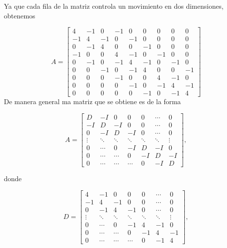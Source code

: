     Ya que cada fila de la matriz controla un movimiento en dos dimensiones, obtenemos 

    $$
    A=\left[\begin{array}{ccc|ccc|ccc}
    4 & -1 & 0 & -1 & 0 & 0 & 0 & 0 & 0 \\
    -1 & 4 & -1 & 0 & -1 & 0 & 0 & 0 & 0 \\
    0 & -1 & 4 & 0 & 0 & -1 & 0 & 0 & 0 \\
    \hline-1 & 0 & 0 & 4 & -1 & 0 & -1 & 0 & 0 \\
    0 & -1 & 0 & -1 & 4 & -1 & 0 & -1 & 0 \\
    0 & 0 & -1 & 0 & -1 & 4 & 0 & 0 & -1 \\
    \hline 0 & 0 & 0 & -1 & 0 & 0 & 4 & -1 & 0 \\
    0 & 0 & 0 & 0 & -1 & 0 & -1 & 4 & -1 \\
    0 & 0 & 0 & 0 & 0 & -1 & 0 & -1 & 4
    \end{array}\right]
    $$
De manera general ma matriz que se obtiene es de la forma

$$
A=\left[\begin{array}{ccccccc}
D & -I & 0 & 0 & 0 & \cdots & 0 \\
-I & D & -I & 0 & 0 & \cdots & 0 \\
0 & -I & D & -I & 0 & \cdots & 0 \\
\vdots & \ddots & \ddots & \ddots & \ddots & \ddots & \vdots \\
0 & \cdots & 0 & -I & D & -I & 0 \\
0 & \cdots & \cdots & 0 & -I & D & -I \\
0 & \cdots & \cdots & \cdots & 0 & -I & D
\end{array}\right],
$$

donde 

$$
D=\left[\begin{array}{ccccccc}
4 & -1 & 0 & 0 & 0 & \cdots & 0 \\
-1 & 4 & -1 & 0 & 0 & \cdots & 0 \\
0 & -1 & 4 & -1 & 0 & \cdots & 0 \\
\vdots & \ddots & \ddots & \ddots & \ddots & \ddots & \vdots \\
0 & \cdots & 0 & -1 & 4 & -1 & 0 \\
0 & \cdots & \cdots & 0 & -1 & 4 & -1 \\
0 & \cdots & \cdots & \cdots & 0 & -1 & 4
\end{array}\right],
$$